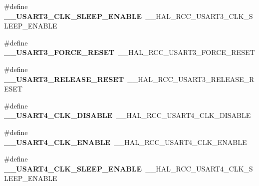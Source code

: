 \begin{DoxyCompactItemize}
\item 
\#define {\bfseries \+\_\+\+\_\+\+U\+S\+A\+R\+T3\+\_\+\+C\+L\+K\+\_\+\+S\+L\+E\+E\+P\+\_\+\+E\+N\+A\+B\+LE}~\+\_\+\+\_\+\+H\+A\+L\+\_\+\+R\+C\+C\+\_\+\+U\+S\+A\+R\+T3\+\_\+\+C\+L\+K\+\_\+\+S\+L\+E\+E\+P\+\_\+\+E\+N\+A\+B\+LE\hypertarget{group___h_a_l___r_c_c___aliased_gad2b6888f9a8ef85b727f7eabf6501d2f}{}\label{group___h_a_l___r_c_c___aliased_gad2b6888f9a8ef85b727f7eabf6501d2f}

\item 
\#define {\bfseries \+\_\+\+\_\+\+U\+S\+A\+R\+T3\+\_\+\+F\+O\+R\+C\+E\+\_\+\+R\+E\+S\+ET}~\+\_\+\+\_\+\+H\+A\+L\+\_\+\+R\+C\+C\+\_\+\+U\+S\+A\+R\+T3\+\_\+\+F\+O\+R\+C\+E\+\_\+\+R\+E\+S\+ET\hypertarget{group___h_a_l___r_c_c___aliased_ga4f128e1456098323bd12668d7c934522}{}\label{group___h_a_l___r_c_c___aliased_ga4f128e1456098323bd12668d7c934522}

\item 
\#define {\bfseries \+\_\+\+\_\+\+U\+S\+A\+R\+T3\+\_\+\+R\+E\+L\+E\+A\+S\+E\+\_\+\+R\+E\+S\+ET}~\+\_\+\+\_\+\+H\+A\+L\+\_\+\+R\+C\+C\+\_\+\+U\+S\+A\+R\+T3\+\_\+\+R\+E\+L\+E\+A\+S\+E\+\_\+\+R\+E\+S\+ET\hypertarget{group___h_a_l___r_c_c___aliased_gaab6dbb36cc19bb8ec325c5236fa8effe}{}\label{group___h_a_l___r_c_c___aliased_gaab6dbb36cc19bb8ec325c5236fa8effe}

\item 
\#define {\bfseries \+\_\+\+\_\+\+U\+S\+A\+R\+T4\+\_\+\+C\+L\+K\+\_\+\+D\+I\+S\+A\+B\+LE}~\+\_\+\+\_\+\+H\+A\+L\+\_\+\+R\+C\+C\+\_\+\+U\+S\+A\+R\+T4\+\_\+\+C\+L\+K\+\_\+\+D\+I\+S\+A\+B\+LE\hypertarget{group___h_a_l___r_c_c___aliased_gac6106654699e6d24b5d4c59830b55923}{}\label{group___h_a_l___r_c_c___aliased_gac6106654699e6d24b5d4c59830b55923}

\item 
\#define {\bfseries \+\_\+\+\_\+\+U\+S\+A\+R\+T4\+\_\+\+C\+L\+K\+\_\+\+E\+N\+A\+B\+LE}~\+\_\+\+\_\+\+H\+A\+L\+\_\+\+R\+C\+C\+\_\+\+U\+S\+A\+R\+T4\+\_\+\+C\+L\+K\+\_\+\+E\+N\+A\+B\+LE\hypertarget{group___h_a_l___r_c_c___aliased_gaf3e74387a8d428bfc2251ce0b4ca795c}{}\label{group___h_a_l___r_c_c___aliased_gaf3e74387a8d428bfc2251ce0b4ca795c}

\item 
\#define {\bfseries \+\_\+\+\_\+\+U\+S\+A\+R\+T4\+\_\+\+C\+L\+K\+\_\+\+S\+L\+E\+E\+P\+\_\+\+E\+N\+A\+B\+LE}~\+\_\+\+\_\+\+H\+A\+L\+\_\+\+R\+C\+C\+\_\+\+U\+S\+A\+R\+T4\+\_\+\+C\+L\+K\+\_\+\+S\+L\+E\+E\+P\+\_\+\+E\+N\+A\+B\+LE\hypertarget{group___h_a_l___r_c_c___aliased_gae998f7bc7193852b391c17b3d919dc6b}{}\label{group___h_a_l___r_c_c___aliased_gae998f7bc7193852b391c17b3d919dc6b}


\end{DoxyCompactItemize}

